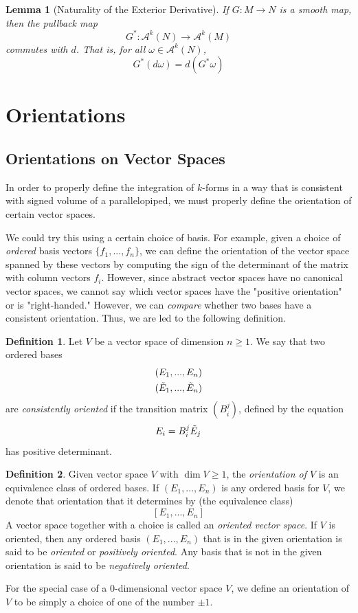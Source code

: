 \documentclass{article}
\newtheorem{lemma}[theorem]{Lemma}
\theoremstyle{remark}
\theoremstyle{definition}
\newtheorem{definition}{Definition}[section]
\begin{document}
    \begin{lemma}[Naturality of the Exterior Derivative]
    If $G: M \longrightarrow N$ is a smooth map, then the pullback map
    \[G^* : \mathcal{A}^k (N) \longrightarrow \mathcal{A}^k (M)\]
    commutes with $d$. That is, for all $\omega \in \mathcal{A}^k (N)$, 
    \[G^*(d \omega) = d (G^* \omega) \]
    \end{lemma}

\section{Orientations}

  \subsection{Orientations on Vector Spaces}

    In order to properly define the integration of $k$-forms in a way that is consistent with signed volume of a parallelopiped, we must properly define the orientation of certain vector spaces. 

    We could try this using a certain choice of basis. For example, given a choice of \textit{ordered} basis vectors $\{f_1, ..., f_n\}$, we can define the orientation of the vector space spanned by these vectors by computing the sign of the determinant of the matrix with column vectors $f_i$. However, since abstract vector spaces have no canonical vector spaces, we cannot say which vector spaces have the "positive orientation" or is "right-handed." However, we can \textit{compare} whether two bases have a consistent orientation. Thus, we are led to the following definition. 

    \begin{definition}
    Let $V$ be a vector space of dimension $n \geq 1$. We say that two ordered bases 
    \begin{align*}
        & (E_1, ..., E_n) \\
        & (\Tilde{E}_1, ..., \Tilde{E}_n)
    \end{align*}
    are \textit{consistently oriented} if the transition matrix $(B^j_i)$, defined by the equation
    \[E_i = B^j_i \Tilde{E}_j\]
    has positive determinant. 
    \end{definition}

    \begin{definition}
    Given vector space $V$ with $\dim{V} \geq 1$, the \textit{orientation of $V$} is an equivalence class of ordered bases. If $(E_1, ..., E_n)$ is any ordered basis for $V$, we denote that orientation that it determines by (the equivalence class)
    \[[E_1, ..., E_n]\]
    A vector space together with a choice is called an \textit{oriented vector space}. If $V$ is oriented, then any ordered basis $(E_1, ..., E_n)$ that is in the given orientation is said to be \textit{oriented} or \textit{positively oriented}. Any basis that is not in the given orientation is said to be \textit{negatively oriented}. 

    For the special case of a $0$-dimensional vector space $V$, we define an orientation of $V$ to be simply a choice of one of the number $\pm 1$. 
    \end{definition}
\end{document}
